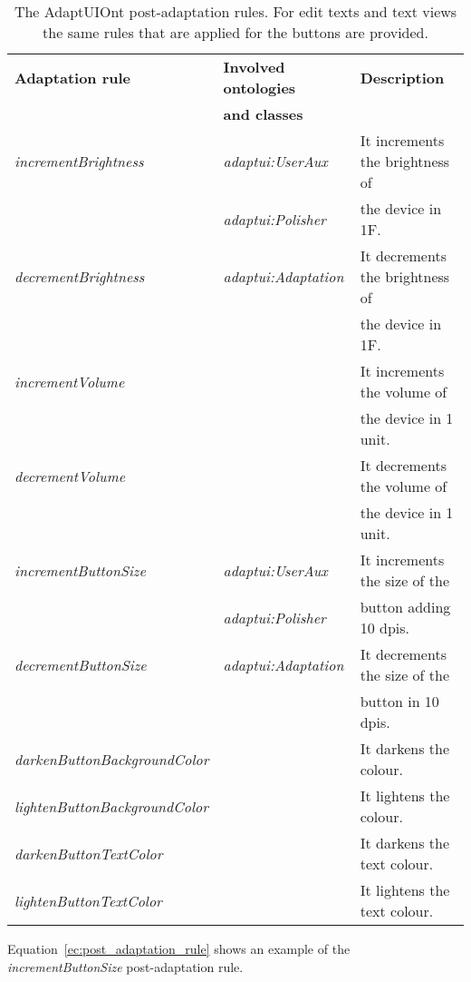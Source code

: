 \begin{table}
  \caption{The AdaptUIOnt post-adaptation rules. For edit texts and text views
  the same rules that are applied for the buttons are provided.}
 \label{tbl:post_adaptation_rules}
\footnotesize
\centering
 \begin{tabular}{l l l}
  \hline 
  \textbf{Adaptation rule} 	& \textbf{Involved ontologies} 	& \textbf{Description} 		\\
				& \textbf{and classes} 		& 				\\
  \hline
  \textit{incrementBrightness}	& \textit{adaptui:UserAux}	& It increments the brightness of\\
				& \textit{adaptui:Polisher}	& the device in 1F.		\\
  \textit{decrementBrightness}	& \textit{adaptui:Adaptation}	& It decrements the brightness of\\
				& 				& the device in 1F.		\\
  \textit{incrementVolume}	& 				& It increments the volume of	\\
				& 				& the device in 1 unit.	\\
  \textit{decrementVolume}	& 				& It decrements the volume of	\\
				& 				& the device in 1 unit.	\\
  \hline
  \textit{incrementButtonSize}	& \textit{adaptui:UserAux}	& It increments the size of the \\
				& \textit{adaptui:Polisher}	& button adding 10 dpis. 	\\
  \textit{decrementButtonSize}	& \textit{adaptui:Adaptation}	& It decrements the size of the \\
				& 				& button in 10 dpis.		\\
  \textit{darkenButtonBackgroundColor}&				& It darkens the colour.	\\
  \textit{lightenButtonBackgroundColor}&			& It lightens the colour.	\\
  \textit{darkenButtonTextColor}&				& It darkens the text colour.	\\
  \textit{lightenButtonTextColor}&				& It lightens the text colour.	\\
  \hline
\end{tabular}
\end{table}

Equation~\ref{ec:post_adaptation_rule} shows an example of the \textit{incrementButtonSize} 
post-adaptation rule.


